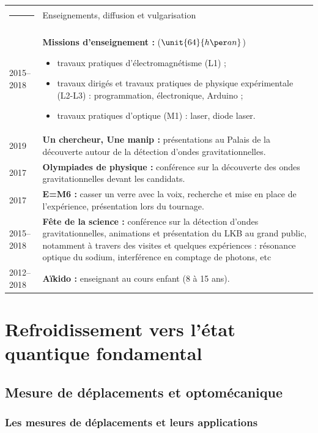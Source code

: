 \documentclass[12pt,a4paper]{article}
\begin{document}
\begin{tabular*}{\textwidth}{p{}<{\raggedleft}p{}}
\textcolor{theme}{\rule{0.12\textwidth}{2.5mm}} &
\large\textcolor{theme}{Enseignements, diffusion et vulgarisation} \vspace{3pt} \\
2015--2018 & \textbf{Missions d'enseignement :} ($\unit{64}{h\per an}$)
\begin{itemize}
\item travaux pratiques d'électromagnétisme (L1) ;
\item travaux dirigés et travaux pratiques de physique expérimentale (L2-L3) : programmation, électronique, Arduino ;
\item travaux pratiques d'optique (M1) : laser, diode laser.
\end{itemize}\\
\vspace{-8mm} 2019 &
\vspace{-8mm} \textbf{Un chercheur, Une manip :} présentations au Palais de la découverte autour de la détection d'ondes gravitationnelles.\\
2017 &
\textbf{Olympiades de physique :} conférence sur la découverte des ondes gravitationnelles devant les candidats.\\
2017 &
\textbf{E=M6 :} casser un verre avec la voix, recherche et mise en place de l'expérience, présentation lors du tournage.\\
2015--2018 &
\textbf{Fête de la science :} conférence sur la détection d'ondes gravitationnelles, animations et présentation du LKB au grand public, notamment à travers des visites et quelques expériences : résonance optique du sodium, interférence en comptage de photons, etc\\
2012--2018 &
\textbf{Aïkido :} enseignant au cours enfant (8 à 15 ans). 
\end{tabular*}

\section{Refroidissement vers l'état quantique fondamental}

\subsection{Mesure de déplacements et optomécanique}
\label{sec:intro}

\subsubsection{Les mesures de déplacements et leurs applications}
\end{document}

